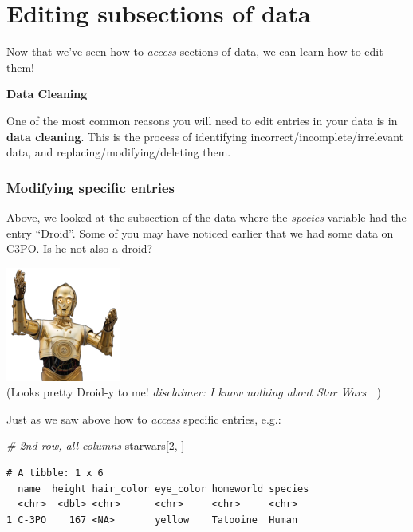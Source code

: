 \documentclass[]{book}
\newenvironment{Shaded}{\begin{snugshade}}{\end{snugshade}}
\newcommand{\CommentTok}[1]{\textcolor[rgb]{0.56,0.35,0.01}{\textit{#1}}}
\newcommand{\DecValTok}[1]{\textcolor[rgb]{0.00,0.00,0.81}{#1}}
\newcommand{\NormalTok}[1]{#1}
\begin{document}
\hypertarget{editing-subsections-of-data}{%
\section{Editing subsections of data}\label{editing-subsections-of-data}}

Now that we've seen how to \emph{access} sections of data, we can learn how to edit them!

\textbf{Data Cleaning}

One of the most common reasons you will need to edit entries in your data is in \textbf{data cleaning}. This is the process of identifying incorrect/incomplete/irrelevant data, and replacing/modifying/deleting them.

\hypertarget{modifying-specific-entries}{%
\subsubsection*{Modifying specific entries}\label{modifying-specific-entries}}

Above, we looked at the subsection of the data where the \emph{species} variable had the entry ``Droid''. Some of you may have noticed earlier that we had some data on C3PO. Is he not also a droid?

\includegraphics{images/types_of_data/c3po.png}\\
(Looks pretty Droid-y to me! \emph{disclaimer: I know nothing about Star Wars} 🙂 )

Just as we saw above how to \emph{access} specific entries, e.g.:

\begin{Shaded}
\begin{Highlighting}[]
\CommentTok{# 2nd row, all columns}
\NormalTok{starwars[}\DecValTok{2}\NormalTok{, ]}
\end{Highlighting}
\end{Shaded}

\begin{verbatim}
# A tibble: 1 x 6
  name  height hair_color eye_color homeworld species
  <chr>  <dbl> <chr>      <chr>     <chr>     <chr>  
1 C-3PO    167 <NA>       yellow    Tatooine  Human  
\end{verbatim}
\end{document}
